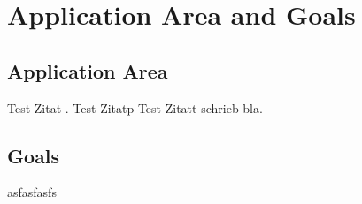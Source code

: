 \chapter{Application Area and Goals}

\section{Application Area}

Test Zitat \cite{statistischesbundesamt2022}.
Test Zitatp \citep{janosi1988}
Test Zitatt \citet{janosi1988} schrieb bla.

\section{Goals}

asfasfasfs
